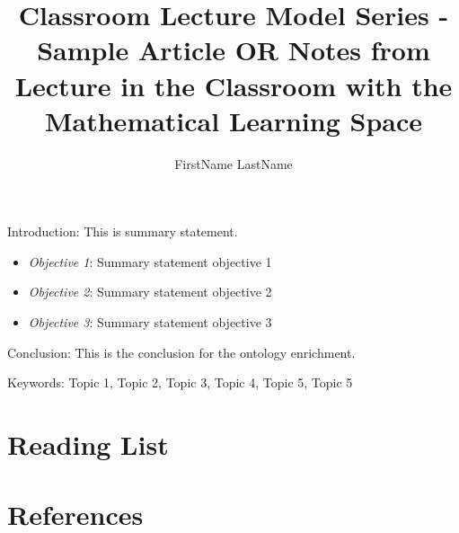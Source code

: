 \documentclass[preprint, 9pt,times]{elsarticle}
\theoremstyle{definition}
\begin{document}
\twocolumn
\scriptsize
	\begin{frontmatter}
		\title{Classroom Lecture Model Series -  Sample Article OR Notes from Lecture in the Classroom with the Mathematical Learning Space}
		\author{FirstName LastName }
		\address{Category, Location1 Location2}
	\end{frontmatter}	
Introduction: This is summary statement.
\begin{itemize}
\item \textit{Objective 1}: Summary statement objective 1
\item \textit{Objective 2}: Summary statement objective 2
\item \textit{Objective 3}: Summary statement objective 3
\end{itemize}		
Conclusion:  This is the conclusion for the ontology enrichment.
		
Keywords: Topic 1, Topic 2, Topic 3, Topic 4, Topic 5, Topic 5

\section{Reading List}


\section{References}
\end{document}
